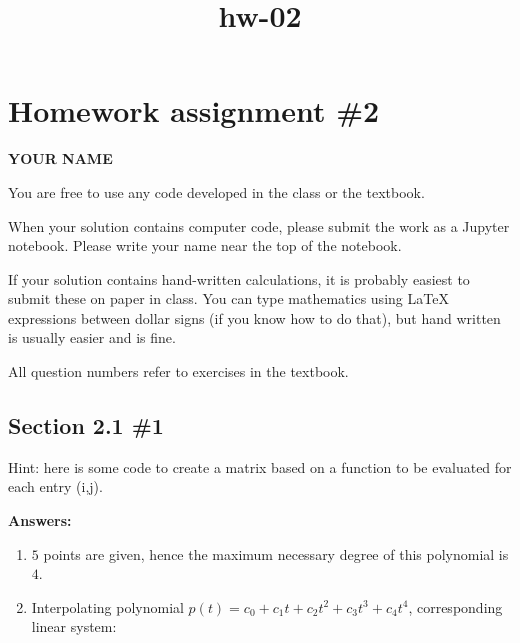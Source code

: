 \documentclass[11pt]{article}
\title{hw-02}
\begin{document}
    
    \maketitle
    
    

    
    \hypertarget{homework-assignment-2}{%
\section{Homework assignment \#2}\label{homework-assignment-2}}

\textbf{YOUR NAME}

You are free to use any code developed in the class or the textbook.

When your solution contains computer code, please submit the work as a
Jupyter notebook. Please write your name near the top of the notebook.

If your solution contains hand-written calculations, it is probably
easiest to submit these on paper in class. You can type mathematics
using LaTeX expressions between dollar signs (if you know how to do
that), but hand written is usually easier and is fine.

All question numbers refer to exercises in the textbook.

    \hypertarget{section-2.1-1}{%
\subsection{Section 2.1 \#1}\label{section-2.1-1}}

Hint: here is some code to create a matrix based on a function to be
evaluated for each entry (i,j).

\textbf{Answers:}

\begin{enumerate}
\def\labelenumi{(\alph{enumi})}
\item
  \(5\) points are given, hence the maximum necessary degree of this
  polynomial is \(4\).
\item
  Interpolating polynomial
  \(p(t)=c_0+c_1 t + c_2 t^2 + c_3 t^3 + c_4 t^4\), corresponding linear
  system:
\end{enumerate}
\end{document}
